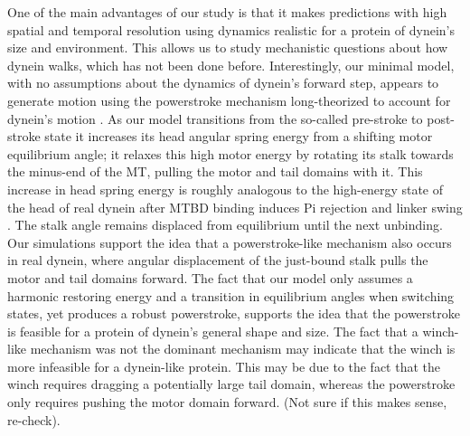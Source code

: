 \documentclass[9pt,twocolumn,twoside]{article}
\begin{document}
One of the main advantages of our study is that it makes predictions with high spatial and temporal resolution using dynamics realistic for a protein of dynein's size and environment. This allows us to study mechanistic questions about how dynein walks, which has not been done before. Interestingly, our minimal model, with no assumptions about the dynamics of dynein's forward step, appears to generate motion using the powerstroke mechanism long-theorized to account for dynein's motion \cite{mallikps, burgessknight, robertspowerstroke, burgess-paper}. As our model transitions from the so-called pre-stroke to post-stroke state it increases its head angular spring energy from a shifting motor equilibrium angle; it relaxes this high motor energy by rotating its stalk towards the minus-end of the MT, pulling the motor and tail domains with it. This increase in head spring energy is roughly analogous to the high-energy state of the head of real dynein after MTBD binding induces Pi rejection and linker swing \cite{MANY-CITATIONS-HERE}. The stalk angle remains displaced from equilibrium until the next unbinding. Our simulations support the idea that a powerstroke-like mechanism also occurs in real dynein, where angular displacement of the just-bound stalk pulls the motor and tail domains forward. The fact that our model only assumes a harmonic restoring energy and a transition in equilibrium angles when switching states, yet produces a robust powerstroke, supports the idea that the powerstroke is feasible for a protein of dynein's general shape and size. The fact that a winch-like mechanism was not the dominant mechanism may indicate that the winch is more infeasible for a dynein-like protein. This may be due to the fact that the winch requires dragging a potentially large tail domain, whereas the powerstroke only requires pushing the motor domain forward. (Not sure if this makes sense, re-check).
\end{document}
